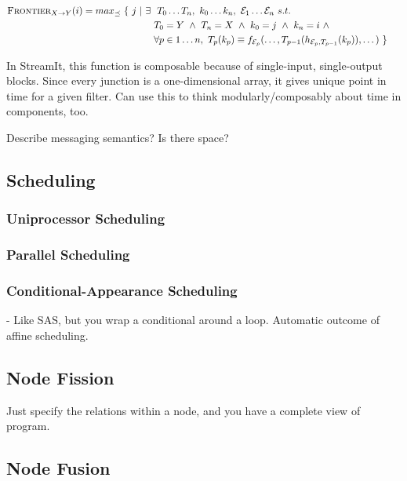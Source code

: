 \begin{align*}
\textsc{Frontier}_{X \small{\rightarrow} Y}(i) = max_{\preceq}~\{~ j ~|~ \exists ~&~ T_0 \dots T_n, ~ k_0 \dots k_n, ~ {\cal E}_1 \dots {\cal E}_n ~ s.t. ~ & ~ \\ 
~ & T_0 = Y ~\wedge~ T_n = X ~\wedge~ k_0 = j ~\wedge~ k_n = i ~\wedge~ & ~ \\
~ & \forall p \in 1 \dots n, ~ T_p(k_p) \equiv f_{{\cal E}_p}(\dots, T_{p-1}(h_{{{\cal E}_p}, T_{p-1}}(k_p)), \dots) ~ \} & ~ \\
\end{align*}

In StreamIt, this function is composable because of single-input,
single-output blocks.  Since every junction is a one-dimensional
array, it gives unique point in time for a given filter.  Can use this
to think modularly/composably about time in components, too.

Describe messaging semantics?  Is there space?

\subsection{Scheduling}

\subsubsection{Uniprocessor Scheduling}

\subsubsection{Parallel Scheduling}

\subsubsection{Conditional-Appearance Scheduling}

- Like SAS, but you wrap a conditional around a loop.  Automatic
  outcome of affine scheduling.

\subsection{Node Fission}

Just specify the relations within a node, and you have a complete view
of program.

\subsection{Node Fusion}

